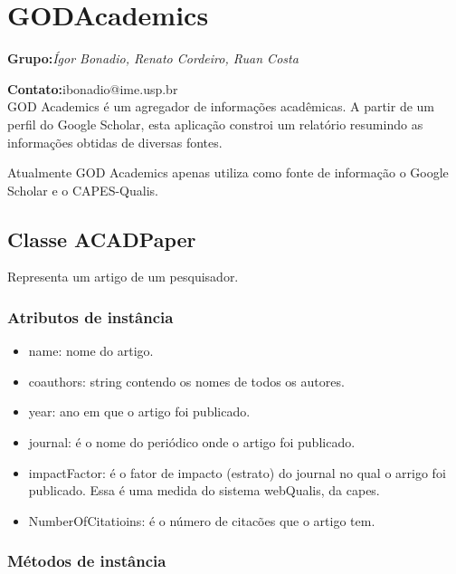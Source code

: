 \section{GODAcademics}

\textbf{Grupo:}\textit{Ígor Bonadio, Renato Cordeiro, Ruan Costa}

\textbf{Contato:}ibonadio@ime.usp.br\\

GOD Academics é um agregador de informações acadêmicas. A partir de um perfil do Google Scholar, esta aplicação constroi um relatório resumindo as informações obtidas de diversas fontes.

Atualmente GOD Academics apenas utiliza como fonte de informação o Google Scholar e o CAPES-Qualis.

\subsection{Classe ACADPaper}

Representa um artigo de um pesquisador.

\subsubsection{Atributos de instância}

\begin{itemize}
  \item name: nome do artigo.

  \item coauthors: string contendo os nomes de todos os autores.

  \item year: ano em que o artigo foi publicado.

  \item journal: é o nome do periódico onde o artigo foi publicado.

  \item impactFactor: é o fator de impacto (estrato) do journal no qual o arrigo foi publicado. Essa é uma    medida do sistema webQualis, da capes.

  \item NumberOfCitatioins: é o número de citacões que o artigo tem.
\end{itemize}

\subsubsection{Métodos de instância}

